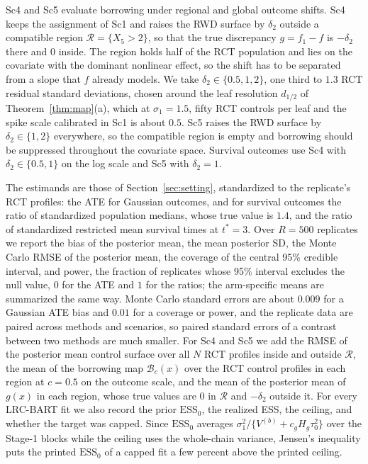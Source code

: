 \documentclass[11pt]{article}
\theoremstyle{definition}
\theoremstyle{plain}
\begin{document}
Sc4 and Sc5 evaluate borrowing under regional and global outcome shifts. Sc4 keeps the assignment of Sc1 and raises the RWD surface by $\delta_2$ outside a compatible region $\mathcal R=\{X_5>2\}$, so that the true discrepancy $g=f_1-f$ is $-\delta_2$ there and $0$ inside. The region holds half of the RCT population and lies on the covariate with the dominant nonlinear effect, so the shift has to be separated from a slope that $f$ already models. We take $\delta_2\in\{0.5,1,2\}$, one third to $1.3$ RCT residual standard deviations, chosen around the leaf resolution $d_{1/2}$ of Theorem~\ref{thm:map}(a), which at $\sigma_1=1.5$, fifty RCT controls per leaf and the spike scale calibrated in Sc1 is about $0.5$. Sc5 raises the RWD surface by $\delta_2\in\{1,2\}$ everywhere, so the compatible region is empty and borrowing should be suppressed throughout the covariate space. Survival outcomes use Sc4 with $\delta_2\in\{0.5,1\}$ on the log scale and Sc5 with $\delta_2=1$.

The estimands are those of Section~\ref{sec:setting}, standardized to the replicate's RCT profiles: the ATE for Gaussian outcomes, and for survival outcomes the ratio of standardized population medians, whose true value is $1.4$, and the ratio of standardized restricted mean survival times at $t^\ast=3$. Over $R=500$ replicates we report the bias of the posterior mean, the mean posterior SD, the Monte Carlo RMSE of the posterior mean, the coverage of the central 95\% credible interval, and power, the fraction of replicates whose 95\% interval excludes the null value, $0$ for the ATE and $1$ for the ratios; the arm-specific means are summarized the same way. Monte Carlo standard errors are about $0.009$ for a Gaussian ATE bias and $0.01$ for a coverage or power, and the replicate data are paired across methods and scenarios, so paired standard errors of a contrast between two methods are much smaller. For Sc4 and Sc5 we add the RMSE of the posterior mean control surface over all $N$ RCT profiles inside and outside $\mathcal R$, the mean of the borrowing map $\mathcal B_c(x)$ over the RCT control profiles in each region at $c=0.5$ on the outcome scale, and the mean of the posterior mean of $g(x)$ in each region, whose true values are $0$ in $\mathcal R$ and $-\delta_2$ outside it. For every LRC-BART fit we also record the prior $\mathrm{ESS}_0$, the realized ESS, the ceiling, and whether the target was capped. Since $\mathrm{ESS}_0$ averages $\sigma_1^2/\{V^{(b)}+c_gH_g\tau_0^2\}$ over the Stage-1 blocks while the ceiling uses the whole-chain variance, Jensen's inequality puts the printed $\mathrm{ESS}_0$ of a capped fit a few percent above the printed ceiling.
\end{document}
